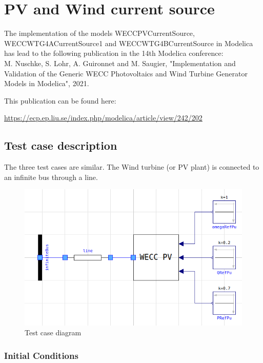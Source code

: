 \documentclass[a4paper, 12pt]{report}
\begin{document}
\section{PV and Wind current source}
The implementation of the models WECCPVCurrentSource, WECCWTG4ACurrentSource1 and WECCWTG4BCurrentSource in Modelica has lead to the following publication in the 14th Modelica conference:\\

M. Nuschke, S. Lohr, A. Guironnet and M. Saugier, "Implementation and Validation of the Generic WECC Photovoltaics and Wind Turbine Generator Models in Modelica", 2021.\\

\par This publication can be found here:

\url{https://ecp.ep.liu.se/index.php/modelica/article/view/242/202}

\subsection{Test case description}

\par The three test cases are similar. The Wind turbine (or PV plant) is connected to an infinite bus through a line.

\begin{figure}[H]
  \includegraphics[width=\textwidth]{WECC.png}
  \caption{Test case diagram}
\end{figure}

\subsubsection{Initial Conditions}
\end{document}
